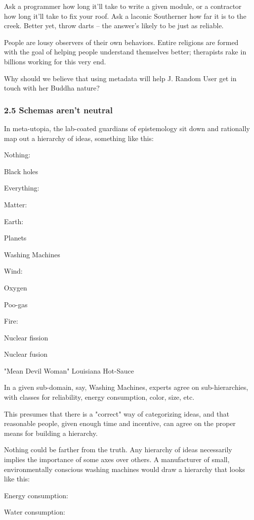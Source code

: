 Ask a programmer how long it'll take to write a given module, or a
contractor how long it'll take to fix your roof. Ask a laconic
Southerner how far it is to the creek. Better yet, throw darts --
the answer's likely to be just as reliable.

People are lousy observers of their own behaviors. Entire religions
are formed with the goal of helping people understand themselves
better; therapists rake in billions working for this very end.

Why should we believe that using metadata will help J. Random User
get in touch with her Buddha nature?

\subsubsection{2.5 Schemas aren't neutral}

In meta-utopia, the lab-coated guardians of epistemology sit down
and rationally map out a hierarchy of ideas, something like this:

Nothing:

Black holes

Everything:

Matter:

Earth:

Planets

Washing Machines

Wind:

Oxygen

Poo-gas

Fire:

Nuclear fission

Nuclear fusion

"Mean Devil Woman" Louisiana Hot-Sauce

In a given sub-domain, say, Washing Machines, experts agree on
sub-hierarchies, with classes for reliability, energy consumption,
color, size, etc.

This presumes that there is a "correct" way of categorizing ideas,
and that reasonable people, given enough time and incentive, can
agree on the proper means for building a hierarchy.

Nothing could be farther from the truth. Any hierarchy of ideas
necessarily implies the importance of some axes over others. A
manufacturer of small, environmentally conscious washing machines
would draw a hierarchy that looks like this:

Energy consumption:

Water consumption:

